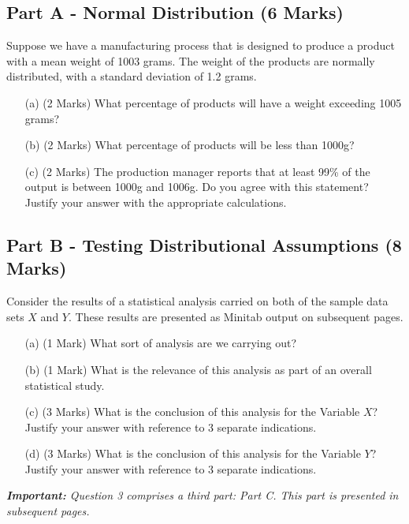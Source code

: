 \documentclass[a4paper,12pt]{article}
\begin{document}

\subsection*{Part A - Normal Distribution (6 Marks)}

Suppose we have a manufacturing process that is designed to produce a product with a mean weight of 1003 grams. The weight of the products are normally distributed, with a standard deviation of 1.2 grams.


\begin{itemize}
	\item[(a)] (2 Marks) What percentage of products will have a weight exceeding 1005 grams?
	\item[(b)] (2 Marks) What percentage of products will be less than 1000g?
	\item[(c)] (2 Marks) The production manager reports that at least 99\% of the output is between 1000g and 1006g. Do you agree with this statement? Justify your answer with the appropriate calculations.
\end{itemize}

\subsection*{Part B - Testing Distributional Assumptions (8 Marks)}
Consider the results of a statistical analysis carried on both of the sample data sets $X$ and $Y$. These results are presented as Minitab output on subsequent pages.

\begin{itemize}
	\item[(a)] (1 Mark) What sort of analysis are we carrying out? 
	\item[(b)] (1 Mark) What is the relevance of this analysis as part of an overall statistical study.
	\item[(c)] (3 Marks) What is the conclusion of this analysis for the Variable $X$? Justify your answer with reference to 3 separate indications.
	\item[(d)] (3 Marks) What is the conclusion of this analysis for the Variable $Y$? Justify your answer with reference to 3 separate indications.
	
\end{itemize}
\bigskip
\textit{\textbf{Important:} Question 3 comprises a third part: Part C. This part is presented in subsequent pages.}
\newpage
\end{document}
